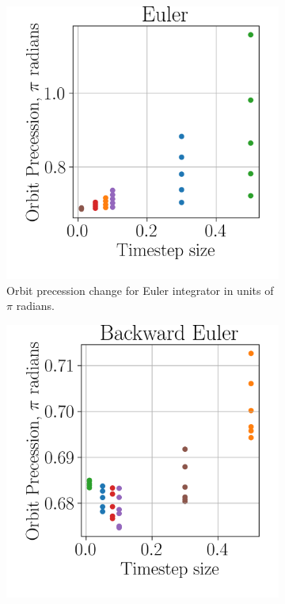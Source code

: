 \begin{figure}[!ht]
	\centering
	\begin{subfigure}[h!]{0.3\textwidth}
		\centering
		\includegraphics[width=\textwidth]{figures/precession_analysis/euler.png}
		\caption{Orbit precession change for Euler integrator in units of $\pi$ radians. }
		\label{fig:euler_precession_analysis}
	\end{subfigure}
	\hfill	
	\begin{subfigure}[h!]{0.3\textwidth}
		\centering
		\includegraphics[width=\textwidth]{figures/precession_analysis/back_euler.png}

\end{subfigure}
\end{figure}
